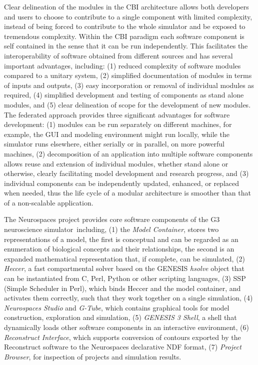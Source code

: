 \documentclass[12pt]{article}
\begin{document}
Clear delineation of the modules in the CBI architecture allows both
developers and users to choose to contribute to a single component
with limited complexity, instead of being forced to contribute to the
whole simulator and be exposed to tremendous complexity. Within the
CBI paradigm each software component is self contained in the sense
that it can be run independently. This facilitates the
interoperability of software obtained from different sources and has
several important advantages, including: (1) reduced complexity of
software modules compared to a unitary system, (2) simplified
documentation of modules in terms of inputs and outputs, (3) easy
incorporation or removal of individual modules as required, (4)
simplified development and testing of components as stand alone
modules, and (5) clear delineation of scope for the development of new
modules. The federated approach provides three significant advantages
for software development: (1) modules can be run separately on
different machines, for example, the GUI and modeling environment
might run locally, while the simulator runs elsewhere, either serially
or in parallel, on more powerful machines, (2) decomposition of an
application into multiple software components allows reuse and
extension of individual modules, whether stand alone or otherwise,
clearly facilitating model development and research progress, and (3)
individual components can be independently updated, enhanced, or
replaced when needed, thus the life cycle of a modular architecture is
smoother than that of a non-scalable application.

The Neurospaces project provides core software components of the G3
neuroscience simulator\,\cite{cornelis03:_neuros} including, (1) the
{\it Model Container}, stores two representations of a model, the
first is conceptual and can be regarded as an enumeration of
biological concepts and their relationships, the second is an expanded
mathematical representation that, if complete, can be simulated, (2)
{\it Heccer}, a fast compartmental solver based on the GENESIS {\it
  hsolve} object that can be instantiated from C, Perl, Python or
other scripting languages, (3) SSP (Simple Scheduler in Perl), which
binds Heccer and the model container, and activates them correctly,
such that they work together on a single simulation, (4) {\it
  Neurospaces Studio} and {\it G-Tube}, which contains graphical tools
for model construction, exploration and simulation, (5) {\it GENESIS 3
  Shell}, a shell that dynamically loads other software components in
an interactive environment, (6) {\it Reconstruct Interface}, which
supports conversion of contours exported by the Reconstruct software
to the Neurospaces declarative NDF format, (7) {\it Project Browser},
for inspection of projects and simulation results.
\end{document}
